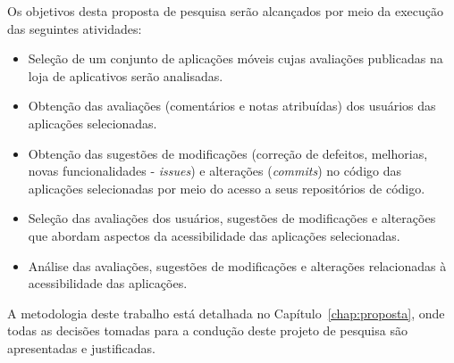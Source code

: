 Os objetivos desta proposta de pesquisa serão alcançados por meio da execução das seguintes atividades: 
\begin{itemize}
 \item Seleção de um conjunto de aplicações móveis cujas avaliações publicadas na loja de aplicativos serão analisadas.
 \item Obtenção das avaliações (comentários e notas atribuídas) dos usuários das aplicações selecionadas.
 \item Obtenção das sugestões de modificações (correção de defeitos, melhorias, novas funcionalidades - \textit{issues}) e alterações (\textit{commits}) no código das aplicações selecionadas por meio do acesso a seus repositórios de código.
 \item Seleção das avaliações dos usuários, sugestões de modificações e alterações que abordam aspectos da acessibilidade das aplicações selecionadas.
 \item Análise das avaliações, sugestões de modificações e alterações relacionadas à acessibilidade das aplicações.
 \end{itemize}

A metodologia deste trabalho está detalhada no Capítulo~\ref{chap:proposta}, onde todas as decisões tomadas para a condução deste projeto de pesquisa são apresentadas e justificadas. 




